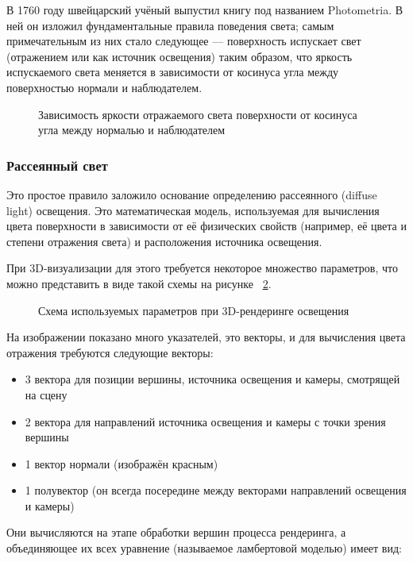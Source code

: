 В 1760 году швейцарский учёный выпустил книгу под названием Photometria. В ней он изложил фундаментальные правила поведения света; самым примечательным из них стало следующее — поверхность испускает свет (отражением или как источник освещения) таким образом, что яркость испускаемого света меняется в зависимости от косинуса угла между поверхностью нормали и наблюдателем.

\begin{figure}[H]
	\caption{Зависимость яркости отражаемого света поверхности от косинуса угла между нормалью и наблюдателем}
	\label{diagram9:image}
\end{figure}

\subsubsection{Рассеянный свет}

Это простое правило заложило основание определению рассеянного (diffuse light) освещения. Это математическая модель, используемая для вычисления цвета поверхности в зависимости от её физических свойств (например, её цвета и степени отражения света) и расположения источника освещения.

При 3D-визуализации для этого требуется некоторое множество параметров, что можно представить в виде такой схемы на рисунке ~\ref{diagram10:image}.

\begin{figure}[H]
	\caption{Схема используемых параметров при 3D-рендеринге освещения}
	\label{diagram10:image}
\end{figure}

На изображении показано много указателей, это векторы, и для вычисления цвета отражения требуются следующие векторы:
\begin{itemize}
	\item 3 вектора для позиции вершины, источника освещения и камеры, смотрящей на сцену
	\item 2 вектора для направлений источника освещения и камеры с точки зрения вершины
	\item 1 вектор нормали (изображён красным)
	\item 1 полувектор (он всегда посередине между векторами направлений освещения и камеры)
\end{itemize}

Они вычисляются на этапе обработки вершин процесса рендеринга, а объединяющее их всех уравнение (называемое ламбертовой моделью) имеет вид:

